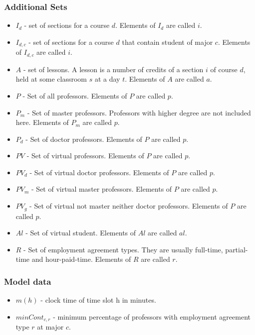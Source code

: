\subsubsection{Additional Sets}
\begin{itemize}
\item $I_{d}$ - set of sections for a course $d$.  Elements of $I_{d}$ are called $i$.
\item $I_{d,c}$ - set of sections for a course $d$ that contain student of major $c$. Elements of $I_{d,c}$ are called $i$.
\item $A$ - set of lessons. A lesson is a number of credits of a section $i$ of course $d$, held at some classroom $s$ at a day $t$. Elements of $A$ are called $a$.
\item $P$ - Set of all professors. Elements of $P$ are called $p$.
\item $P_{m}$ - Set of master professors. Professors with higher degree are not included here. Elements of $P_{m}$ are called $p$.
\item $P_{d}$ - Set of doctor professors. Elements of $P$ are called $p$.
\item $PV$ - Set of virtual professors. Elements of $P$ are called $p$.
\item $PV_{d}$ - Set of virtual doctor professors. Elements of $P$ are called $p$.
\item $PV_{m}$ - Set of virtual master professors. Elements of $P$ are called $p$.
\item $PV_{g}$ - Set of virtual not master neither doctor professors. Elements of $P$ are called $p$.
\item $Al$ - Set of virtual student. Elements of $Al$ are called $al$.
\item $R$ - Set of employment agreement types. They are usually full-time, partial-time and hour-paid-time. Elements of $R$ are called $r$.
\end{itemize}


\subsubsection{Model data}
\begin{itemize}
\item $m(h)$ - clock time of time slot h in minutes.
\item $minCont_{c,r}$ - minimum percentage of professors with employment agreement type $r$ at major $c$.
\end{itemize}

